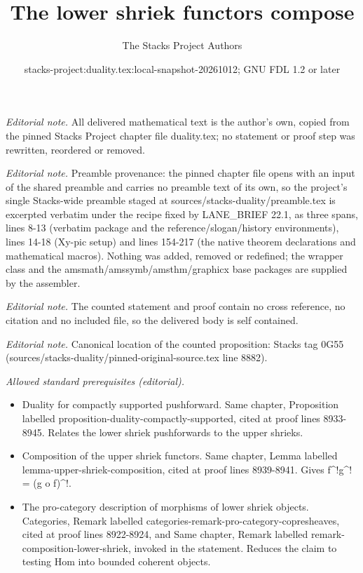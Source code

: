 \documentclass[10pt,a4paper]{amsart}
\title{The lower shriek functors compose}
\author{The Stacks Project Authors}
\date{stacks-project:duality.tex:local-snapshot-20261012; GNU FDL 1.2 or later}
\theoremstyle{plain}
\theoremstyle{definition}
\theoremstyle{remark}
\numberwithin{equation}{subsection}
\begin{document}
\maketitle
\noindent\textit{Editorial note.} All delivered mathematical text is the author's own, copied from the pinned Stacks Project chapter file duality.tex; no statement or proof step was rewritten, reordered or removed.\par\medskip
\noindent\textit{Editorial note.} Preamble provenance: the pinned chapter file opens with an input of the shared preamble and carries no preamble text of its own, so the project's single Stacks-wide preamble staged at sources/stacks-duality/preamble.tex is excerpted verbatim under the recipe fixed by LANE\_BRIEF 22.1, as three spans, lines 8-13 (verbatim package and the reference/slogan/history environments), lines 14-18 (Xy-pic setup) and lines 154-217 (the native theorem declarations and mathematical macros). Nothing was added, removed or redefined; the wrapper class and the amsmath/amssymb/amsthm/graphicx base packages are supplied by the assembler.\par\medskip
\noindent\textit{Editorial note.} The counted statement and proof contain no cross reference, no citation and no included file, so the delivered body is self contained.\par\medskip
\noindent\textit{Editorial note.} Canonical location of the counted proposition: Stacks tag 0G55 (sources/stacks-duality/pinned-original-source.tex line 8882).\par\medskip
\noindent\textit{Allowed standard prerequisites (editorial).}\begin{itemize}
\item Duality for compactly supported pushforward. Same chapter, Proposition labelled proposition-duality-compactly-supported, cited at proof lines 8933-8945. Relates the lower shriek pushforwards to the upper shrieks.
\item Composition of the upper shriek functors. Same chapter, Lemma labelled lemma-upper-shriek-composition, cited at proof lines 8939-8941. Gives f\textasciicircum{}!g\textasciicircum{}! = (g o f)\textasciicircum{}!.
\item The pro-category description of morphisms of lower shriek objects. Categories, Remark labelled categories-remark-pro-category-copresheaves, cited at proof lines 8922-8924, and Same chapter, Remark labelled remark-composition-lower-shriek, invoked in the statement. Reduces the claim to testing Hom into bounded coherent objects.
\end{itemize}\medskip
\end{document}
